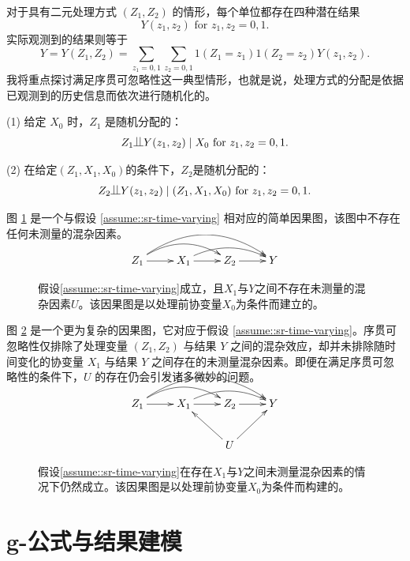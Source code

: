 对于具有二元处理方式 $(Z_1, Z_2 )$ 的情形，每个单位都存在四种潜在结果  
$$
Y(z_1, z_2)  \text{ for } z_1, z_2  = 0, 1.
$$  
实际观测到的结果则等于  
$$
Y = Y(Z_1,Z_2) = \sum_{z_1=0,1} \sum_{z_2=0,1}  1(Z_1=z_1) 1(Z_2=z_2) Y(z_1, z_2).
$$  
我将重点探讨满足序贯可忽略性这一典型情形，也就是说，处理方式的分配是依据已观测到的历史信息而依次进行随机化的。

\begin{assumption}
[序贯可忽略性]
\label{assume::sr-time-varying} 
(1)
给定 $X_0$ 时，$Z_1$ 是随机分配的：
$$
Z_1 \ind Y(z_1, z_2) \mid X_0 \text{ for } z_1, z_2  = 0, 1.
$$

(2)
在给定$( Z_1, X_1, X_0)$的条件下，$Z_2$是随机分配的：
$$
Z_2\ind Y(z_1, z_2) \mid (Z_1, X_1, X_0) \text{ for } z_1, z_2  = 0, 1.
$$
\end{assumption}
 
 
 图 \ref{fig::si-simple} 是一个与假设 \ref{assume::sr-time-varying} 相对应的简单因果图，该图中不存在任何未测量的混杂因素。 
 
\begin{figure}
\bigskip 
$$
 \xymatrix{
 Z_1 \ar[r]  \ar@/^1.3pc/[rr]  \ar@/^2.0pc/[rrr] & X_1  \ar@/^1pc/[rr]\ar[r]  & Z_2  \ar[r] & Y
 }
 $$
 \caption{假设\ref{assume::sr-time-varying}成立，且$X_1$与$Y$之间不存在未测量的混杂因素$U$。该因果图是以处理前协变量$X_0$为条件而建立的。}\label{fig::si-simple}
\end{figure}



  图 \ref{fig::si-complex} 是一个更为复杂的因果图，它对应于假设 \ref{assume::sr-time-varying}。序贯可忽略性仅排除了处理变量 $( Z_1, Z_2) $ 与结果 $Y$ 之间的混杂效应，却并未排除随时间变化的协变量 $X_1$ 与结果 $Y$ 之间存在的未测量混杂因素。即便在满足序贯可忽略性的条件下，$U$ 的存在仍会引发诸多微妙的问题。 

\begin{figure}
\bigskip 
$$
 \xymatrix{
 Z_1 \ar[r] \ar@/^1.3pc/[rr] \ar@/^2.0pc/[rrr] & X_1  \ar@/^1pc/[rr]\ar[r]  & Z_2  \ar[r] & Y \\
                                             &                                             &U\ar[lu]\ar[ru]
 }
 $$
 \caption{假设\ref{assume::sr-time-varying}在存在$X_1$与$Y$之间未测量混杂因素的情况下仍然成立。该因果图是以处理前协变量$X_0$为条件而构建的。}\label{fig::si-complex}
\end{figure}



\section{g-公式与结果建模}
\label{section:si-outcome-regression}



